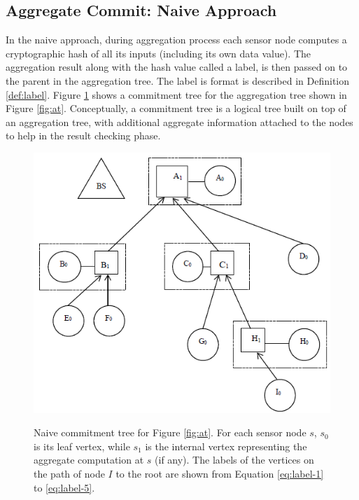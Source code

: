		\subsection{Aggregate Commit: Naive Approach}
			\label{sub:aggregate_commit_naive_approach}
			In the naive approach, during aggregation process each sensor node computes a cryptographic hash of all its inputs (including its own data value).
			The aggregation result along with the hash value called a label, is then passed on to the parent in the aggregation tree.
			The label is format is described in Definition \ref{def:label}.
			Figure \ref{fig:naive-commitment-tree} shows a commitment tree for the aggregation tree shown in Figure \ref{fig:at}.
			Conceptually, a commitment tree is a logical tree built on top of an aggregation tree, with additional aggregate information attached to the nodes to help in the result checking phase.
			\begin{figure}[h!]
				\centering
				\includegraphics[scale = 1]{images/naive-commitment-tree.png}\\
				\caption{Naive commitment tree for Figure \ref{fig:at}.
				For each sensor node $s$, $s_{0}$ is its leaf vertex, while $s_{1}$ is the internal vertex representing the aggregate computation at $s$ (if any).
				The labels of the vertices on the path of node $I$ to the root are shown from Equation \ref{eq:label-1} to \ref{eq:label-5}.}
				\label{fig:naive-commitment-tree}
			\end{figure}

